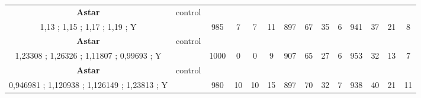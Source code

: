 \begin{table}[]
{\begin{tabular}{|c|c|c|c|c|c|c|c|c|c|c|c|c|c|}
\cellcolor{blue!15}\textbf{Astar} & control& {\color[HTML]{00009B} } & {\color[HTML]{9A0000} } & {\color[HTML]{009901} } &  & {\color[HTML]{00009B} } & {\color[HTML]{9A0000} } & {\color[HTML]{009901} } &  & {\color[HTML]{00009B} } & {\color[HTML]{9A0000} } & {\color[HTML]{009901} } &  \\ 
\cellcolor{ blue!15}1,13 ; 1,15 ; 1,17 ; 1,19 ; Y &  & \multirow{-2}{*}{{\color[HTML]{00009B} 985}} & \multirow{-2}{*}{{\color[HTML]{9A0000} 7}} & \multirow{-2}{*}{{\color[HTML]{009901} 7}} & \multirow{-2}{*}{11} & \multirow{-2}{*}{{\color[HTML]{00009B} 897}} & \multirow{-2}{*}{{\color[HTML]{9A0000} 67}} & \multirow{-2}{*}{{\color[HTML]{009901} 35}} & \multirow{-2}{*}{6} & \multirow{-2}{*}{{\color[HTML]{00009B} 941}} & \multirow{-2}{*}{{\color[HTML]{9A0000} 37}} & \multirow{-2}{*}{{\color[HTML]{009901} 21}} & \multirow{-2}{*}{8} \\ \hline

\cellcolor{blue!15}\textbf{Astar} & control& {\color[HTML]{00009B} } & {\color[HTML]{9A0000} } & {\color[HTML]{009901} } &  & {\color[HTML]{00009B} } & {\color[HTML]{9A0000} } & {\color[HTML]{009901} } &  & {\color[HTML]{00009B} } & {\color[HTML]{9A0000} } & {\color[HTML]{009901} } &  \\ 
\cellcolor{ blue!15}1,23308 ; 1,26326 ; 1,11807 ; 0,99693 ; Y &  & \multirow{-2}{*}{{\color[HTML]{00009B} 1000}} & \multirow{-2}{*}{{\color[HTML]{9A0000} 0}} & \multirow{-2}{*}{{\color[HTML]{009901} 0}} & \multirow{-2}{*}{9} & \multirow{-2}{*}{{\color[HTML]{00009B} 907}} & \multirow{-2}{*}{{\color[HTML]{9A0000} 65}} & \multirow{-2}{*}{{\color[HTML]{009901} 27}} & \multirow{-2}{*}{6} & \multirow{-2}{*}{{\color[HTML]{00009B} 953}} & \multirow{-2}{*}{{\color[HTML]{9A0000} 32}} & \multirow{-2}{*}{{\color[HTML]{009901} 13}} & \multirow{-2}{*}{7} \\ \hline

\cellcolor{blue!15}\textbf{Astar} & control& {\color[HTML]{00009B} } & {\color[HTML]{9A0000} } & {\color[HTML]{009901} } &  & {\color[HTML]{00009B} } & {\color[HTML]{9A0000} } & {\color[HTML]{009901} } &  & {\color[HTML]{00009B} } & {\color[HTML]{9A0000} } & {\color[HTML]{009901} } &  \\ 
\cellcolor{ blue!15}0,946981 ; 1,120938 ; 1,126149 ; 1,23813 ; Y &  & \multirow{-2}{*}{{\color[HTML]{00009B} 980}} & \multirow{-2}{*}{{\color[HTML]{9A0000} 10}} & \multirow{-2}{*}{{\color[HTML]{009901} 10}} & \multirow{-2}{*}{15} & \multirow{-2}{*}{{\color[HTML]{00009B} 897}} & \multirow{-2}{*}{{\color[HTML]{9A0000} 70}} & \multirow{-2}{*}{{\color[HTML]{009901} 32}} & \multirow{-2}{*}{7} & \multirow{-2}{*}{{\color[HTML]{00009B} 938}} & \multirow{-2}{*}{{\color[HTML]{9A0000} 40}} & \multirow{-2}{*}{{\color[HTML]{009901} 21}} & \multirow{-2}{*}{11} \\ \hline


\end{tabular}}
\end{table}
